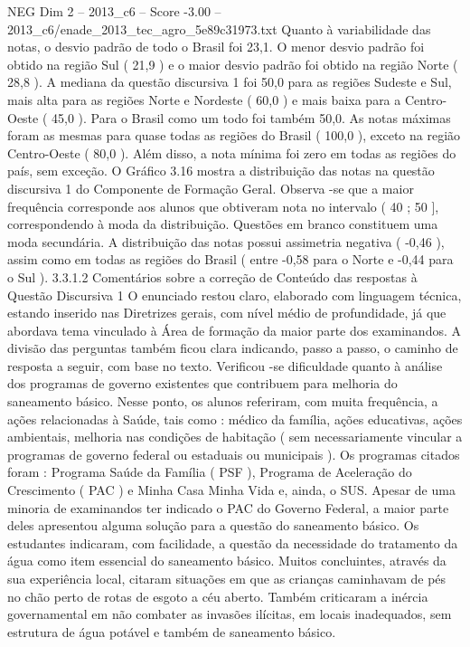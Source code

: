 \begin{textsample}{NEG Dim 2 – 2013\_c6 – Score -3.00 – 2013\_c6/enade\_2013\_tec\_agro\_5e89c31973.txt}
Quanto à variabilidade das notas, o desvio padrão de todo o Brasil foi 23,1.
O menor desvio padrão foi obtido na região Sul ( 21,9 ) e o maior desvio padrão foi obtido na região Norte ( 28,8 ).
A mediana da questão discursiva 1 foi 50,0 para as regiões Sudeste e Sul, mais alta para as regiões Norte e Nordeste ( 60,0 ) e mais baixa para a Centro-Oeste ( 45,0 ).
Para o Brasil como um todo foi também 50,0.
As notas máximas foram as mesmas para quase todas as regiões do Brasil ( 100,0 ), exceto na região Centro-Oeste ( 80,0 ).
Além disso, a nota mínima foi zero em todas as regiões do país, sem exceção.
O Gráfico 3.16 mostra a distribuição das notas na questão discursiva 1 do Componente de Formação Geral.
Observa -se que a maior frequência corresponde aos alunos que obtiveram nota no intervalo ( 40 ; 50 ], correspondendo à moda da distribuição.
Questões em branco constituem uma moda secundária.
A distribuição das notas possui assimetria negativa ( -0,46 ), assim como em todas as regiões do Brasil ( entre -0,58 para o Norte e -0,44 para o Sul ). 3.3.1.2 Comentários sobre a correção de Conteúdo das respostas à Questão Discursiva 1 O enunciado restou claro, elaborado com linguagem técnica, estando inserido nas Diretrizes gerais, com nível médio de profundidade, já que abordava tema vinculado à Área de formação da maior parte dos examinandos.
A divisão das perguntas também ficou clara indicando, passo a passo, o caminho de resposta a seguir, com base no texto.
Verificou -se dificuldade quanto à análise dos programas de governo existentes que contribuem para melhoria do saneamento básico.
Nesse ponto, os alunos referiram, com muita frequência, a ações relacionadas à Saúde, tais como : médico da família, ações educativas, ações ambientais, melhoria nas condições de habitação ( sem necessariamente vincular a programas de governo federal ou estaduais ou municipais ).
Os programas citados foram : Programa Saúde da Família ( PSF ), Programa de Aceleração do Crescimento ( PAC ) e Minha Casa Minha Vida e, ainda, o SUS.
Apesar de uma minoria de examinandos ter indicado o PAC do Governo Federal, a maior parte deles apresentou alguma solução para a questão do saneamento básico.
Os estudantes indicaram, com facilidade, a questão da necessidade do tratamento da água como item essencial do saneamento básico.
Muitos concluintes, através da sua experiência local, citaram situações em que as crianças caminhavam de pés no chão perto de rotas de esgoto a céu aberto.
Também criticaram a inércia governamental em não combater as invasões ilícitas, em locais inadequados, sem estrutura de água potável e também de saneamento básico.

\end{textsample}
